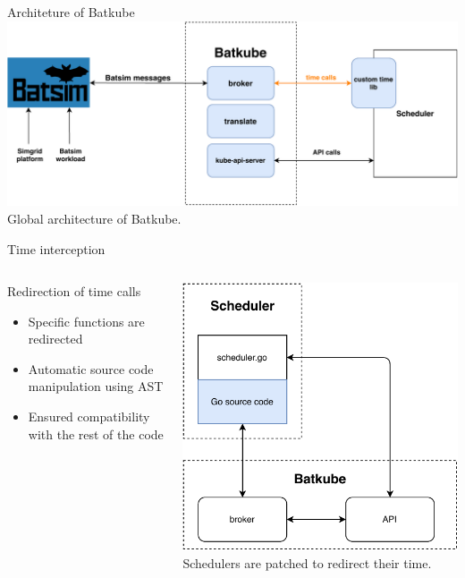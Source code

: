 \documentclass[12pt, aspectratio=43]{beamer}
\begin{document}
\begin{frame}{Architeture of Batkube}
	\centering
	\includegraphics[width=\textwidth]{../imgs/batkube-architecture-3-synchro.pdf}
	\small{Global architecture of Batkube.}
\end{frame}

\begin{frame}{Time interception}
	\begin{columns}
		\begin{block}{Redirection of time calls}
			\begin{itemize}
				\item Specific functions are redirected
				\item Automatic source code manipulation using AST
				\item Ensured compatibility with the rest of the code
			\end{itemize}
		\end{block}
		
		\centering
		\includegraphics[width=\textwidth]{../imgs/synchro-go-sources.pdf}\\
		\small{Schedulers are patched to redirect their time.}
	\end{columns}
\end{frame}
\end{document}
